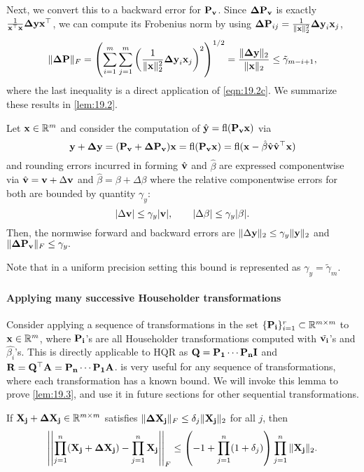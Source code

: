 Next, we convert this to a backward error for $\mathbf{P_v}$.
Since $\mathbf{\Delta P_v}$ is exactly $\frac{1}{\mathbf{x}^{\top}\mathbf{x}}\mathbf{\Delta y}\mathbf{x}^{\top}$, we can compute its Frobenius norm by using $\mathbf{\Delta P}_{ij} = \frac{1}{\|\mathbf{x}\|_2^2}\mathbf{\Delta y}_i\mathbf{x}_j$,
	\begin{equation*}
	\|\mathbf{\Delta P}\|_F
	= \left(\sum_{i=1}^m\sum_{j=1}^m\left(\frac{1}{\|\mathbf{x}\|_2^2}\mathbf{\Delta y}_i\mathbf{x}_j\right)^2\right)^{1/2}
	=  \frac{\|\mathbf{\Delta y}\|_2}{\|\mathbf{x}\|_2} \leq \tilde{\gamma}_{m-i+1},
	\end{equation*}
where the last inequality is a direct application of \cref{eqn:19.2c}.
We summarize these results in \cref{lem:19.2}.
\begin{lemma}
	\label{lem:19.2}
	Let $\mathbf{x}\in\mathbb{R}^m$ and consider the computation of $\hat{\mathbf{y}}=\mathrm{fl}(\mathbf{P_vx})$ via 
	\begin{equation*}
		\mathbf{y}+\mathbf{\Delta y} = (\mathbf{P_v} + \mathbf{\Delta P_v})\mathbf{x} =\mathrm{fl}(\mathbf{P_v}\mathbf{x}) = \mathrm{fl}(\mathbf{x}-\hat{\beta}\hat{\mathbf{v}}\hat{\mathbf{v}}^{\top}\mathbf{x})
	\end{equation*}
	and rounding errors incurred in forming $\hat{\mathbf{v}}$ and $\hat{\beta}$ are expressed componentwise via $\hat{\mathbf{v}} = \mathbf{v}+\Delta \mathbf{v}$ and $\hat{\beta} = \beta + \Delta \beta$ where the relative componentwise errors for both are bounded by quantity $\gamma_y$:  
	\begin{equation}
		|\Delta \mathbf{v}| \leq \gamma_y|\mathbf{v}|,\qquad |\Delta \beta| \leq\gamma_y |\beta|.
	\end{equation}
	Then, the normwise forward and backward errors are $\|\Delta \mathbf{y}\|_2 \leq \gamma_y\|\mathbf{y}\|_2$ and $ \|\mathbf{\Delta P_v}\|_F \leq \gamma_y.$
\end{lemma}
Note that in a uniform precision setting this bound is represented as $\gamma_y = \tilde{\gamma}_{m}$. 
\paragraph{Applying many successive Householder transformations}
Consider applying a sequence of transformations in the set $\{\mathbf{P_i}\}_{i=1}^r\subset\mathbb{R}^{m\times m}$ to $\mathbf{x}\in\mathbb{R}^m$, where $\mathbf{P_i}$'s are all Householder transformations computed with $\tilde{\mathbf{v_i}}$'s and $\hat{\beta_i}$'s.
This is directly applicable to HQR as $\mathbf{Q}=\mathbf{P_1}\cdots\mathbf{P_n}\mathbf{I}$ and $\mathbf{R} = \mathbf{Q}^{\top}\mathbf{A} = \mathbf{P_n}\cdots\mathbf{P_1}\mathbf{A}$.
 is very useful for any sequence of transformations, where each transformation has a known bound.
We will invoke this lemma to prove \cref{lem:19.3}, and use it in future sections for other sequential transformations.
\begin{lemma}\label{lem:3.7}
	If $\mathbf{X_j} + \mathbf{\Delta X_j} \in\mathbb{R}^{m\times m}$ satisfies $\|\mathbf{\Delta X_j}\|_F\leq \delta_j \|\mathbf{X_j}\|_2$ for all $j$, then $$\left|\left|\prod_{j=1}^n (\mathbf{X_j} + \mathbf{\Delta X_j})- \prod_{j=1}^n\mathbf{X_j} \right|\right|_F\leq\left(-1+\prod_{j=1}^n(1+\delta_j)\right)\prod_{j=1}^n\|\mathbf{X_j}\|_2.$$
\end{lemma}

